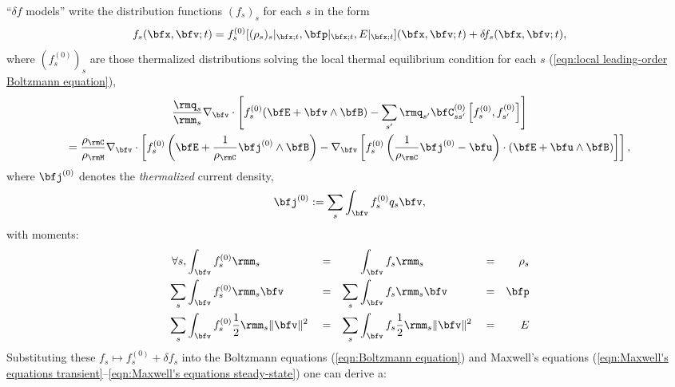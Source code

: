     \begin{definition}\label{def:delta f models}
        ``$\delta\!f$ models'' write the distribution functions $(f_{s})_{s}$ for each $s$ in the form
        \begin{equation}
            f_{s}(\bfx, \bfv; t)  =  f_{s}^{(0)}[(\rho_{s})_{s}|_{\bfx; t}, \bfp|_{\bfx; t}, E|_{\bfx; t}](\bfx, \bfv; t) + \delta\!f_{s}(\bfx, \bfv; t),
        \end{equation}
        where $\left(f_{s}^{(0)}\right)_{s}$ are those thermalized distributions solving the local thermal equilibrium condition for each $s$ (\ref{eqn:local leading-order Boltzmann equation}),
        \begin{multline}\label{eqn:thermal equilibrium identity}
            \frac{\rmq_{s}}{\rmm_{s}}\nabla_{\bfv}\cdot\left[f_{s}^{(0)}(\bfE + \bfv\wedge\bfB) - \sum_{s'}\rmq_{s'}\bfC_{ss'}^{(0)}\left[f_{s}^{(0)}, f_{s'}^{(0)}\right]\right]  \\
            =  \frac{\rho_{\rmC}}{\rho_{\rmM}}\nabla_{\bfv}\cdot\left[f_{s}^{(0)}\left(\bfE + \frac{1}{\rho_{\rmC}}\bfj^{(0)}\wedge\bfB\right) - \nabla_{\bfv}\left[f_{s}^{(0)}\left(\frac{1}{\rho_{\rmC}}\bfj^{(0)} - \bfu\right)\cdot\left(\bfE + \bfu\wedge\bfB\right)\right]\right],
        \end{multline}
        where $\bfj^{(0)}$ denotes the \emph{thermalized} current density,
        \begin{equation}
            \bfj^{(0)}  :=  \sum_{s}\int_{\bfv}f_{s}^{(0)}q_{s}\bfv,
        \end{equation}
        with moments:
        \begin{align}
            \forall s,          &\int_{\bfv}f_{s}^{(0)}\rmm_{s}                         &  &=  &          &\int_{\bfv}f_{s}\rmm_{s}                         &  &=  &  \rho_{s}  \label{eqn:background mass moment}  \\
                        \sum_{s}&\int_{\bfv}f_{s}^{(0)}\rmm_{s}\bfv                     &  &=  &  \sum_{s}&\int_{\bfv}f_{s}\rmm_{s}\bfv                     &  &=  &  \bfp  \\
                        \sum_{s}&\int_{\bfv}f_{s}^{(0)}\frac{1}{2}\rmm_{s}\|\bfv\|^{2}  &  &=  &  \sum_{s}&\int_{\bfv}f_{s}\frac{1}{2}\rmm_{s}\|\bfv\|^{2}  &  &=  &  E  \label{eqn:background energy moment}
        \end{align}
        Substituting these $f_{s}  \mapsto  f_{s}^{(0)} + \delta\!f_{s}$ into the Boltzmann equations (\ref{eqn:Boltzmann equation}) and Maxwell's equations (\ref{eqn:Maxwell's equations transient}--\ref{eqn:Maxwell's equations steady-state}) one can derive a:

\end{definition}
